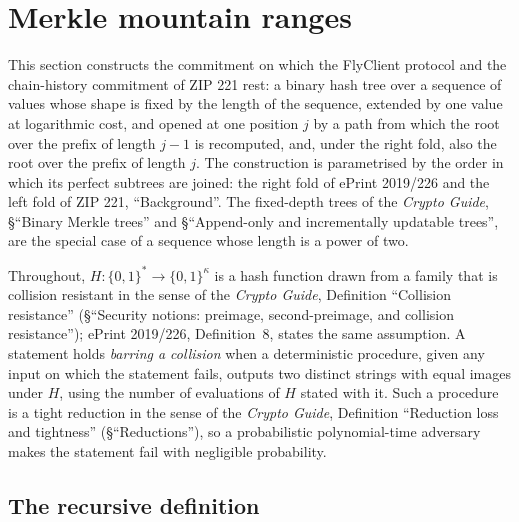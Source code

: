\documentclass[11pt,a4paper]{article}
\theoremstyle{definition}
\begin{document}
\section{Merkle mountain ranges}\label{sec:mmr}

This section constructs the commitment on which the FlyClient protocol and the
chain-history commitment of ZIP 221 rest: a binary hash tree over a sequence
of values whose shape is fixed by the length of the sequence, extended by one
value at logarithmic cost, and opened at one position $j$ by a path from
which the root over the prefix of length $j-1$ is recomputed, and, under the
right fold, also the root over the prefix of length $j$. The
construction is parametrised by the order in which its perfect subtrees are
joined: the right fold of ePrint 2019/226 and the left fold of ZIP 221,
``Background''. The fixed-depth trees of the \emph{Crypto Guide}, \S``Binary
Merkle trees'' and \S``Append-only and incrementally updatable trees'', are the
special case of a sequence whose length is a power of two.

Throughout, $H\colon\{0,1\}^*\to\{0,1\}^\kappa$ is a hash function drawn from
a family that is collision resistant in the sense of the \emph{Crypto Guide},
Definition ``Collision resistance'' (\S``Security notions: preimage,
second-preimage, and collision resistance''); ePrint 2019/226, Definition~8,
states the same assumption. A statement holds \emph{barring a collision}
when a deterministic procedure, given any input on which the statement fails,
outputs two distinct strings with equal images under $H$, using the number of
evaluations of $H$ stated with it. Such a procedure is a tight reduction in
the sense of the \emph{Crypto Guide}, Definition ``Reduction loss and
tightness'' (\S``Reductions''), so a probabilistic polynomial-time adversary
makes the statement fail with negligible probability.

\subsection{The recursive definition}\label{sec:mmr-def}
\end{document}
